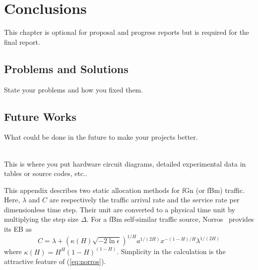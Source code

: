 \documentclass[12pt,oneside,openright,a4paper]{cpe-english-project}
\begin{document}
\chapter{Conclusions}

This chapter is optional for proposal and progress reports but 
is required for the final report.

\section{Problems and Solutions}
State your problems and how you fixed them.

\section{Future Works}
What could be done in the future to make your projects better.


\nocite{*}



 \\

This is where you put hardware circuit diagrams, detailed experimental data in tables or source codes, etc.. \\ \bigskip



This appendix describes two static allocation methods for fGn (or fBm)
traffic. Here, $\lambda$ and $C$ are respectively the traffic arrival
rate and the service rate per dimensionless time step. Their unit are
converted to a physical time unit by multiplying the step size
$\Delta$. For a fBm self-similar traffic source,
Norros~\cite{norros95} provides its EB as
\begin{equation}\label{eq:norros}
  C = \lambda + (\kappa(H)\sqrt{-2\ln\epsilon})^{1/H}a^{1/(2H)}x^{-(1-H)/H}\lambda^{1/(2H)}
\end{equation}
where $\kappa(H) = H^H(1-H)^{(1-H)}$. Simplicity in the calculation is
the attractive feature of (\ref{eq:norros}).
\end{document}
